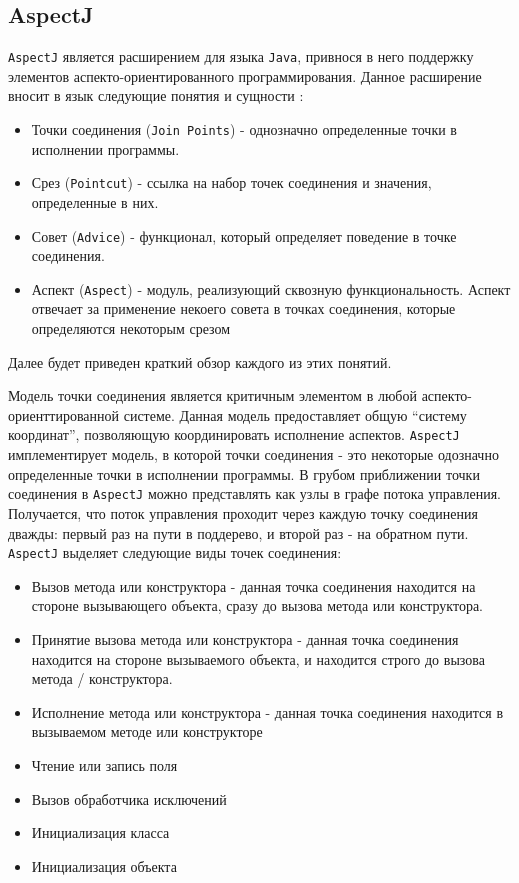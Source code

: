\subsection{AspectJ}

\texttt{AspectJ} является расширением для языка \texttt{Java}, привнося в него поддержку элементов аспекто-ориентированного программирования. Данное расширение вносит в язык следующие понятия и сущности \cite{aspectj}:

\begin{itemize}
    \item Точки соединения (\texttt{Join~Points}) - однозначно определенные точки в исполнении программы.
    \item Срез (\texttt{Pointcut}) - ссылка на набор точек соединения и значения, определенные в них.
    \item Совет (\texttt{Advice}) - функционал, который определяет поведение в точке соединения.
    \item Аспект (\texttt{Aspect}) - модуль, реализующий сквозную функциональность. Аспект отвечает за применение некоего совета в точках соединения, которые определяются некоторым срезом
\end{itemize}

Далее будет приведен краткий обзор каждого из этих понятий.

Модель точки соединения является критичным элементом в любой аспекто-ориенттированной системе. Данная модель предоставляет общую ``систему координат'', позволяющую координировать исполнение аспектов. \texttt{AspectJ} имплементирует модель, в которой точки соединения - это некоторые одозначно определенные точки в исполнении программы. В грубом приближении точки соединения в \texttt{AspectJ} можно представлять как узлы в графе потока управления. Получается, что поток управления проходит через каждую точку соединения дважды: первый раз на пути в поддерево, и второй раз - на обратном пути. \texttt{AspectJ} выделяет следующие виды точек соединения:

\begin{itemize}
    \item Вызов метода или конструктора - данная точка соединения находится на стороне вызывающего объекта, сразу до вызова метода или конструктора.
    \item Принятие вызова метода или конструктора - данная точка соединения находится на стороне вызываемого объекта, и находится строго до вызова метода / конструктора.
    \item Исполнение метода или конструктора - данная точка соединения находится в вызываемом методе или конструкторе
    \item Чтение или запись поля
    \item Вызов обработчика исключений
    \item Инициализация класса
    \item Инициализация объекта
\end{itemize}


